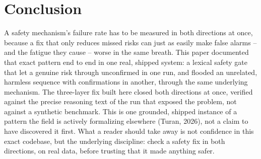 \documentclass[11pt]{article}
\begin{document}
\section{Conclusion}
A safety mechanism's failure rate has to be measured in both directions at once, because a fix that only reduces missed risks can just as easily make false alarms -- and the fatigue they cause -- worse in the same breath. This paper documented that exact pattern end to end in one real, shipped system: a lexical safety gate that let a genuine risk through unconfirmed in one run, and flooded an unrelated, harmless sequence with confirmations in another, through the same underlying mechanism. The three-layer fix built here closed both directions at once, verified against the precise reasoning text of the run that exposed the problem, not against a synthetic benchmark. This is one grounded, shipped instance of a pattern the field is actively formalizing elsewhere (Turan, 2026), not a claim to have discovered it first. What a reader should take away is not confidence in this exact codebase, but the underlying discipline: check a safety fix in both directions, on real data, before trusting that it made anything safer.
\end{document}
